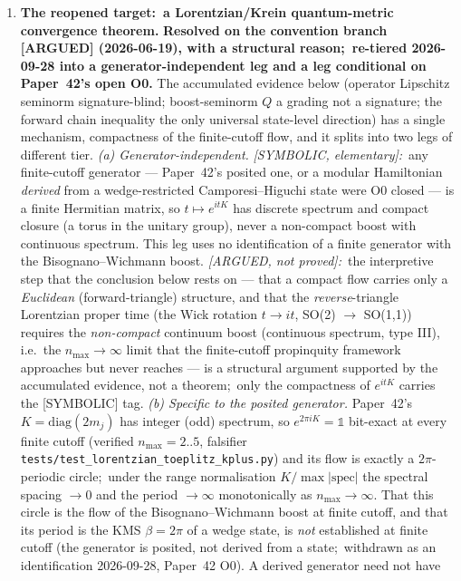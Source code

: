 \documentclass[11pt,a4paper]{article}
\theoremstyle{plain}
\theoremstyle{definition}
\begin{document}
\begin{enumerate}
\item[(Q1)] \textbf{The reopened target:\ a Lorentzian/Krein
quantum-metric convergence theorem.}
\textbf{Resolved on the convention branch [ARGUED] (2026-06-19), with a
structural reason;\ re-tiered 2026-09-28 into a generator-independent leg
and a leg conditional on Paper~42's open O0.} The accumulated evidence below (operator
Lipschitz seminorm signature-blind; boost-seminorm $Q$ a grading not a
signature; the forward chain inequality the only universal state-level
direction) has a single mechanism, compactness of the finite-cutoff flow, and
it splits into two legs of different tier.
\emph{(a) Generator-independent.} \emph{[SYMBOLIC, elementary]:}\ any finite-cutoff
generator --- Paper~42's posited one, or a modular Hamiltonian \emph{derived}
from a wedge-restricted Camporesi--Higuchi state were O0 closed --- is a
finite Hermitian matrix, so $t \mapsto e^{itK}$ has discrete spectrum and
compact closure (a torus in the unitary group), never a non-compact boost with
continuous spectrum. This leg uses no identification of a finite generator
with the Bisognano--Wichmann boost. \emph{[ARGUED, not proved]:}\ the
interpretive step that the conclusion below rests on --- that a compact flow
carries only a \emph{Euclidean} (forward-triangle) structure, and that
the \emph{reverse}-triangle Lorentzian proper time (the Wick rotation
$t \to it$, SO(2) $\to$ SO(1,1)) requires the \emph{non-compact} continuum
boost (continuous spectrum, type III), i.e.\ the $n_{\max} \to \infty$ limit
that the finite-cutoff propinquity framework approaches but never reaches ---
is a structural argument supported by the accumulated evidence, not a
theorem;\ only the compactness of $e^{itK}$ carries the [SYMBOLIC] tag.
\emph{(b) Specific to the posited generator.} Paper~42's
$K = \mathrm{diag}(2m_{j})$ has integer (odd) spectrum, so
$e^{2\pi i K} = \mathbb{1}$ bit-exact at every finite cutoff (verified
$n_{\max}=2..5$, falsifier \texttt{tests/test\_lorentzian\_toeplitz\_kplus.py})
and its flow is exactly a $2\pi$-periodic circle;\ under the range
normalisation $K/\max|\mathrm{spec}|$ the spectral spacing $\to 0$ and the
period $\to \infty$ monotonically as $n_{\max} \to \infty$. That this circle
is the flow of the Bisognano--Wichmann boost at finite cutoff, and that its
period is the KMS
$\beta = 2\pi$ of a wedge state, is \emph{not} established at finite cutoff
(the generator is posited, not derived from a state;\ withdrawn as an
identification 2026-09-28, Paper~42 O0). A derived generator need not have

\end{enumerate}
\end{document}
